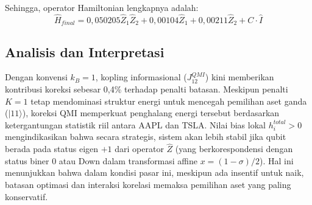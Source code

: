 Sehingga, operator Hamiltonian lengkapnya adalah:
\begin{equation}
\hat{H}_{final} = 0,050205 \hat{Z}_1 \hat{Z}_2 + 0,00104 \hat{Z}_1 + 0,00211 \hat{Z}_2 + C \cdot \hat{I}
\end{equation}

\subsection{Analisis dan Interpretasi}
Dengan konvensi $k_B=1$, kopling informasional ($J_{12}^{QMI}$) kini memberikan kontribusi koreksi sebesar 0,4\% terhadap penalti batasan. Meskipun penalti $K=1$ tetap mendominasi struktur energi untuk mencegah pemilihan aset ganda ($|11\rangle$), koreksi QMI memperkuat penghalang energi tersebut berdasarkan ketergantungan statistik riil antara AAPL dan TSLA. Nilai bias lokal $h_i^{total} > 0$ mengindikasikan bahwa secara strategis, sistem akan lebih stabil jika qubit berada pada status eigen $+1$ dari operator $\hat{Z}$ (yang berkorespondensi dengan status biner $0$ atau Down dalam transformasi affine $x = (1-\sigma)/2$). Hal ini menunjukkan bahwa dalam kondisi pasar ini, meskipun ada insentif untuk naik, batasan optimasi dan interaksi korelasi memaksa pemilihan aset yang paling konservatif.
